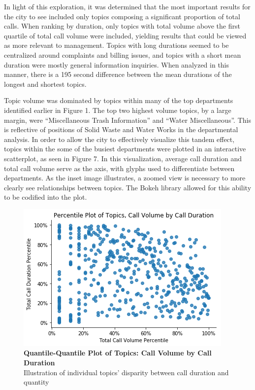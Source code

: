 \documentclass[12pt]{article}
\begin{document}
\par
In light of this exploration, it was determined that the most important results for the city to see included only topics composing a significant proportion of total calls.  When ranking by duration, only topics with total volume above the first quartile of total call volume were included, yielding results that could be viewed as more relevant to management.  Topics with long durations seemed to be centralized around complaints and billing issues, and topics with a short mean duration were mostly general information inquiries.  When analyzed in this manner, there is a 195 second difference between the mean durations of the longest and shortest topics.

\par
Topic volume was dominated by topics within many of the top departments identified earlier in Figure 1.  The top two highest volume topics, by a large margin, were “Miscellaneous Trash Information” and “Water Miscellaneous”.  This is reflective of positions of Solid Waste and Water Works in the departmental analysis.  In order to allow the city to effectively visualize this tandem effect, topics within the some of the busiest departments were plotted in an interactive scatterplot, as seen in Figure 7.  In this visualization, average call duration and total call volume serve as the axis, with glyphs used to differentiate between departments.  As the inset image illustrates, a zoomed view is necessary to more clearly see relationships between topics.  The Bokeh library allowed for this ability to be codified into the plot.


	\begin{figure}
	\includegraphics[scale=.4]{new_q-q_plot.png}
	\caption{\textbf{Quantile-Quantile Plot of Topics: Call Volume by Call Duration} \\
	Illustration of individual topics' disparity between call duration and quantity}
	\end{figure}
\end{document}
